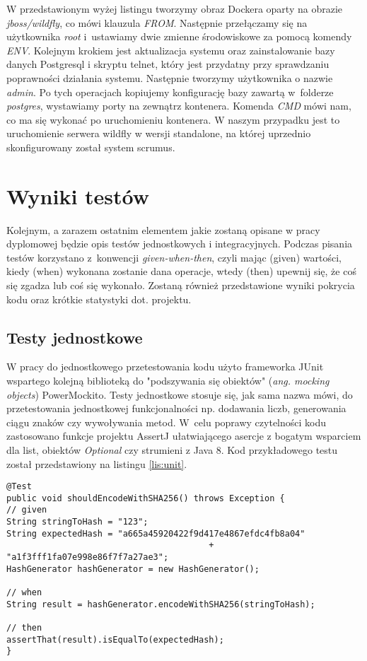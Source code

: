 W przedstawionym wyżej listingu tworzymy obraz Dockera oparty na obrazie \textit{jboss/wildfly}, co mówi klauzula \textit{FROM}. Następnie przełączamy się na użytkownika \textit{root} i~ustawiamy dwie zmienne środowiskowe za pomocą komendy \textit{ENV}. Kolejnym krokiem jest aktualizacja systemu oraz zainstalowanie bazy danych Postgresql i skryptu telnet, który jest przydatny przy sprawdzaniu poprawności działania systemu. Następnie tworzymy użytkownika o nazwie \textit{admin}. Po tych operacjach kopiujemy konfigurację bazy zawartą w~folderze \textit{postgres}, wystawiamy porty na zewnątrz kontenera. Komenda \textit{CMD} mówi nam, co ma się wykonać po uruchomieniu kontenera. W naszym przypadku jest to uruchomienie serwera wildfly w wersji standalone, na której uprzednio skonfigurowany został system scrumus.

\section{Wyniki testów}
Kolejnym, a zarazem ostatnim elementem jakie zostaną opisane w pracy dyplomowej będzie opis testów jednostkowych i integracyjnych. Podczas pisania testów korzystano z~konwencji \textit{given-when-then}, czyli mając (given) wartości, kiedy (when) wykonana zostanie dana operacje, wtedy (then) upewnij się, że coś się zgadza lub coś się wykonało. Zostaną również przedstawione wyniki pokrycia kodu oraz krótkie statystyki dot. projektu.

\subsection{Testy jednostkowe}
W pracy do jednostkowego przetestowania kodu użyto frameworka JUnit wspartego kolejną biblioteką do "podszywania się obiektów" (\textit{ang. mocking objects}) PowerMockito. Testy jednostkowe stosuje się, jak sama nazwa mówi, do przetestowania jednostkowej funkcjonalności np. dodawania liczb, generowania ciągu znaków czy wywoływania metod. W~celu poprawy czytelności kodu zastosowano funkcje projektu AssertJ ułatwiającego asercje z bogatym wsparciem dla list, obiektów \textit{Optional} czy strumieni z Java 8. Kod przykładowego testu został przedstawiony na listingu \ref{lis:unit}.

\begin{lstlisting}[caption={Kod przykładowego testu jednostkowego}, label=lis:unit, numbers=none]
@Test
public void shouldEncodeWithSHA256() throws Exception {
// given
String stringToHash = "123";
String expectedHash = "a665a45920422f9d417e4867efdc4fb8a04"
										+ "a1f3fff1fa07e998e86f7f7a27ae3";
HashGenerator hashGenerator = new HashGenerator();

// when
String result = hashGenerator.encodeWithSHA256(stringToHash);

// then
assertThat(result).isEqualTo(expectedHash);
}\end{lstlisting}

